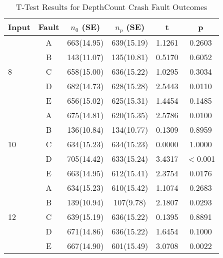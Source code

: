 \begin{table}[htbp]
\small{
\begin{center}
    \begin{tabular}{|p{0.7cm}|c|c|c|c|c|}
    \hline
    \textbf{Input} & \textbf{Fault} & \textbf{$n_0$ (SE)} & \textbf{$n_p$ (SE)} & \textbf{t} & \textbf{p} \\ \hline
    \multirow{5}{*}{8}
    & A & 663(14.95) & 639(15.19) & 1.1261 & 0.2603 \\
	& B & 143(11.07) & 135(10.81) & 0.5170 & 0.6052 \\
 	& C & 658(15.00) & 636(15.22) & 1.0295 & 0.3034 \\
 	& D & 682(14.73) & 628(15.28) & 2.5443 & 0.0110 \\
 	& E & 656(15.02) & 625(15.31) & 1.4454 & 0.1485 \\ \hline
    \multirow{5}{*}{10}
    & A & 675(14.81) & 620(15.35) & 2.5786 & 0.0100 \\
	& B & 136(10.84) & 134(10.77) & 0.1309 & 0.8959 \\
 	& C & 634(15.23) & 634(15.23) & 0.0000 & 1.0000 \\
 	& D & 705(14.42) & 633(15.24) & 3.4317 & $<$0.001 \\
 	& E & 663(14.95) & 612(15.41) & 2.3754 & 0.0176 \\ \hline
 	\multirow{5}{*}{12}
    & A & 634(15.23) & 610(15.42) & 1.1074 & 0.2683 \\
	& B & 139(10.94) & 107(9.78) & 2.1807 & 0.0293 \\
 	& C & 639(15.19) & 636(15.22) & 0.1395 & 0.8891 \\
 	& D & 671(14.86) & 636(15.22) & 1.6454 & 0.1000 \\
 	& E & 667(14.90) & 601(15.49) & 3.0708 & 0.0022 \\ \hline
    \hline
    \end{tabular}
    \end{center}
    }
    \caption{T-Test Results for DepthCount Crash Fault Outcomes}
    \label{tab:DepthCount_Crash_TTest}
\end{table}

